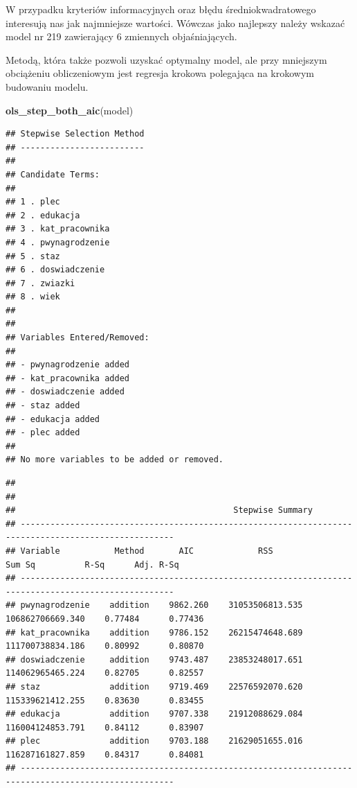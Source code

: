 \documentclass[]{book}
\newenvironment{Shaded}{\begin{snugshade}}{\end{snugshade}}
\newcommand{\KeywordTok}[1]{\textcolor[rgb]{0.13,0.29,0.53}{\textbf{#1}}}
\newcommand{\NormalTok}[1]{#1}
\begin{document}
W przypadku kryteriów informacyjnych oraz błędu średniokwadratowego interesują nas jak najmniejsze wartości. Wówczas jako najlepszy należy wskazać model nr 219 zawierający 6 zmiennych objaśniających.

Metodą, która także pozwoli uzyskać optymalny model, ale przy mniejszym obciążeniu obliczeniowym jest regresja krokowa polegająca na krokowym budowaniu modelu.

\begin{Shaded}
\begin{Highlighting}[]
\KeywordTok{ols_step_both_aic}\NormalTok{(model)}
\end{Highlighting}
\end{Shaded}

\begin{verbatim}
## Stepwise Selection Method 
## -------------------------
## 
## Candidate Terms: 
## 
## 1 . plec 
## 2 . edukacja 
## 3 . kat_pracownika 
## 4 . pwynagrodzenie 
## 5 . staz 
## 6 . doswiadczenie 
## 7 . zwiazki 
## 8 . wiek 
## 
## 
## Variables Entered/Removed: 
## 
## - pwynagrodzenie added 
## - kat_pracownika added 
## - doswiadczenie added 
## - staz added 
## - edukacja added 
## - plec added 
## 
## No more variables to be added or removed.
\end{verbatim}

\begin{verbatim}
## 
## 
##                                            Stepwise Summary                                            
## -----------------------------------------------------------------------------------------------------
## Variable           Method       AIC             RSS               Sum Sq          R-Sq      Adj. R-Sq 
## -----------------------------------------------------------------------------------------------------
## pwynagrodzenie    addition    9862.260    31053506813.535    106862706669.340    0.77484      0.77436 
## kat_pracownika    addition    9786.152    26215474648.689    111700738834.186    0.80992      0.80870 
## doswiadczenie     addition    9743.487    23853248017.651    114062965465.224    0.82705      0.82557 
## staz              addition    9719.469    22576592070.620    115339621412.255    0.83630      0.83455 
## edukacja          addition    9707.338    21912088629.084    116004124853.791    0.84112      0.83907 
## plec              addition    9703.188    21629051655.016    116287161827.859    0.84317      0.84081 
## -----------------------------------------------------------------------------------------------------
\end{verbatim}
\end{document}
